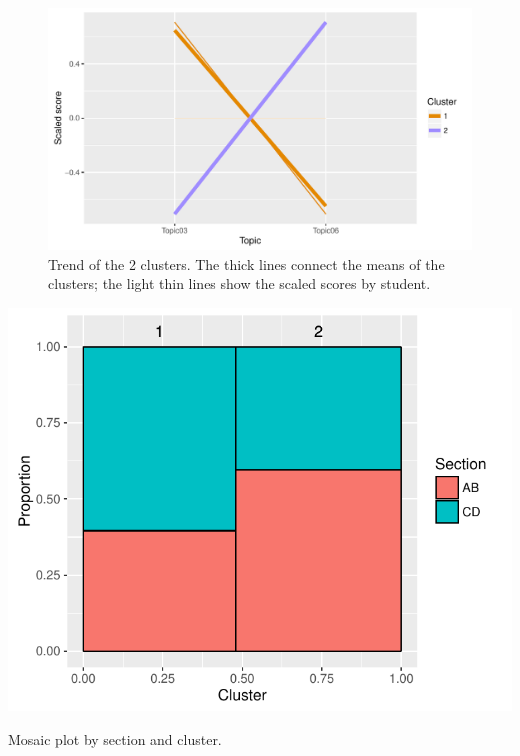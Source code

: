 \documentclass[12pt,nohyper]{tufte-handout}\usepackage[]{graphicx}\usepackage[]{color}
\begin{document}
\begin{center}
\begin{figure}
\begin{centering}
\includegraphics[width=\linewidth]{Stat101_allSections_bestclust}
\par\end{centering}
\caption{\label{fig:bestcut}Trend of the 2 clusters. 
The thick lines connect the means of the clusters; 
the light thin lines show the scaled scores by student.}
\end{figure}\par\end{center}\begin{marginfigure}
\includegraphics[width=0.98\linewidth]{Stat101_allSections_clust_mosaic}
\caption{\label{mar:mosaic}Mosaic plot by section and cluster.}
\end{marginfigure}
\end{document}
